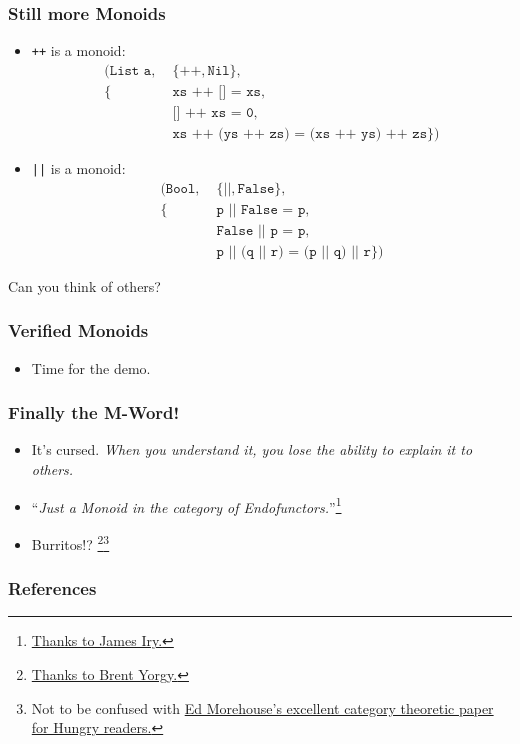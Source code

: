 \documentclass[hyperref={colorlinks = true,linkcolor = blue, citecolor = blue, urlcolor = blue}]{beamer}
\begin{document}
\begin{frame}[fragile]
  \frametitle{Still more Monoids}
  \begin{itemize}
    \item \texttt{++} is a monoid: \begin{align*}
                                (\texttt{List a},
                                 \;&\{\texttt{++},
                                      \texttt{Nil}\}, \\
    \{&\texttt{xs ++ [] = xs}, \\
    &\texttt{[] ++ xs = 0}, \\
    &\texttt{xs ++ (ys ++ zs) = (xs ++ ys) ++ zs} \})
                                 \end{align*}
    \item \texttt{||} is a monoid: \begin{align*}
                                (\texttt{Bool},
                                 \;&\{\texttt{||},
                                      \texttt{False}\}, \\
    \{&\texttt{p || False = p}, \\
    &\texttt{False || p = p}, \\
    &\texttt{p || (q || r) = (p || q) || r} \})
                                 \end{align*}
  \end{itemize}
  Can you think of others?
\end{frame}

\begin{frame}[fragile]
  \frametitle{Verified Monoids}
  \begin{itemize}
    \item Time for the demo.
  \end{itemize}
\end{frame}

\begin{frame}[fragile]
  \frametitle{Finally the M-Word!}
  \begin{itemize}
    \item It's cursed. \textit{When you understand it, you lose the ability to explain it to others.} 
    \item ``\textit{Just a Monoid in the category of Endofunctors.}''\footnote{
      \href{http://james-iry.blogspot.com/2009/05/brief-incomplete-and-mostly-wrong.html}
           {Thanks to James Iry.}}
    \item Burritos!?
      \footnote{
        \href{https://byorgey.wordpress.com/2009/01/12/abstraction-intuition-and-the-monad-tutorial-fallacy/}
             {Thanks to Brent Yorgy.}}\footnote{Not to be confused with \href{https://emorehouse.wescreates.wesleyan.edu/silliness/burrito_monads.pdf}{Ed Morehouse's excellent category theoretic paper for Hungry readers.}}
  \end{itemize}
\end{frame}


\begin{frame}[fragile]
\frametitle{References}
{}
\end{frame}
\end{document}
